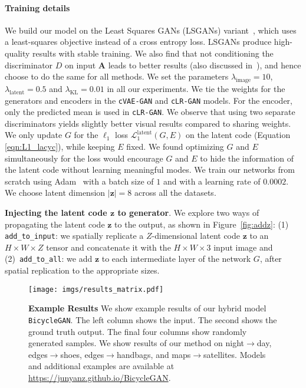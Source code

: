 \documentclass{article}
\newcommand{\cinfogan}{\texttt{cLR-GAN}\xspace}
\newcommand{\cvaegan}{\texttt{cVAE-GAN}\xspace}
\newcommand{\bicycle}{\texttt{BicycleGAN}\xspace} \newcommand{\G}{G\xspace}
\newcommand{\D}{D\xspace}
\newcommand{\E}{E\xspace}
\newcommand{\z}{\mathbf{z}\xspace}
\begin{document}
\paragraph{Training details} We build our model on the Least Squares GANs (LSGANs) variant~\citep{mao2016least}, which uses a least-squares objective instead of a cross entropy loss. LSGANs produce high-quality results with stable training. We also find that not conditioning the discriminator $\D$ on input $\mathbf{A}$ leads to better results (also discussed in~\citep{pathakCVPR16context}), and hence choose to do the same for all methods. We set the parameters $\lambda_{\text{image}}=10$, $\lambda_{\text{latent}}=0.5$ and $\lambda_{\text{KL}}=0.01$ in all our experiments. We tie the weights for the generators and encoders in the \cvaegan and \cinfogan models. For the encoder, only the predicted mean is used in \cinfogan. We observe that using two separate discriminators yields slightly better visual results compared to sharing weights. We only update $\G$ for the $\ell_1$ loss $\mathcal{L}_{1}^{\text{latent}}(\G,\E)$ on the latent code (Equation \ref{eqn:L1_lacyc}), while keeping $\E$ fixed. We found optimizing $\G$ and $\E$ simultaneously for the loss would encourage $G$ and $E$ to hide the information of the latent code without learning meaningful modes.
We train our networks from scratch using Adam~\citep{kingma2014adam} with a batch size of $1$ and with a learning rate of $0.0002$. We choose latent dimension $|\z|=8$ across all the datasets. 

{\bf Injecting the latent code $\z$ to generator}.
We explore two ways of propagating the latent code $\z$ to the output, as shown in Figure~\ref{fig:addz}: 
(1) \texttt{add\_to\_input}: we spatially replicate a $Z$-dimensional latent code $\z$ to an $H\!\times W\!\times Z$ tensor and concatenate it with the $H\!\times W\!\times 3$ input image and (2)~\texttt{add\_to\_all}: we add $\z$ to each intermediate layer of the network $\G$, after spatial replication to the appropriate sizes.

\vspace{-1mm} 
\begin{figure}
\centering
\texttt{[image: imgs/results\_matrix.pdf]}
\caption{\small \textbf{Example Results} We show example results of our hybrid model \bicycle. The left column shows the input. The second shows the ground truth output. The final four columns show randomly generated samples. We show results of our method on night$\rightarrow$day, edges$\rightarrow$shoes, edges$\rightarrow$handbags, and maps$\rightarrow$satellites. Models and additional examples are available at \url{https://junyanz.github.io/BicycleGAN}.} 
\vspace{-2mm}
\label{fig:results}
\end{figure}
\end{document}

